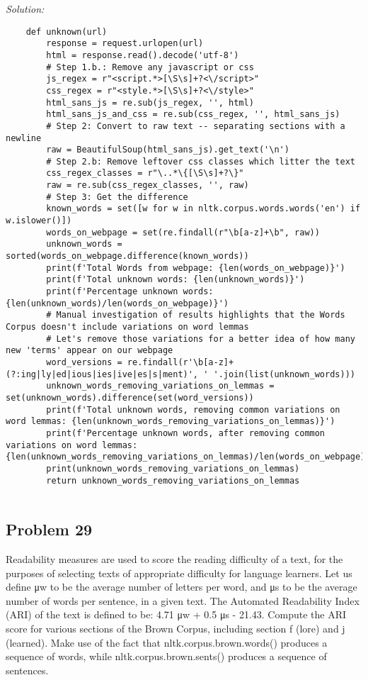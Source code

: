 \documentclass[11pt]{article}
\newenvironment{solution}{
	\vspace{10px}\noindent\emph{Solution:}
}{
	\vspace{10px}
}
\begin{document}
\begin{solution}
	\begin{lstlisting}
	def unknown(url)
		response = request.urlopen(url)
		html = response.read().decode('utf-8')
		# Step 1.b.: Remove any javascript or css
		js_regex = r"<script.*>[\S\s]+?<\/script>"
		css_regex = r"<style.*>[\S\s]+?<\/style>"
		html_sans_js = re.sub(js_regex, '', html)
		html_sans_js_and_css = re.sub(css_regex, '', html_sans_js)
		# Step 2: Convert to raw text -- separating sections with a newline
		raw = BeautifulSoup(html_sans_js).get_text('\n')
		# Step 2.b: Remove leftover css classes which litter the text
		css_regex_classes = r"\..*\{[\S\s]+?\}"
		raw = re.sub(css_regex_classes, '', raw)
		# Step 3: Get the difference  
		known_words = set([w for w in nltk.corpus.words.words('en') if w.islower()])
		words_on_webpage = set(re.findall(r"\b[a-z]+\b", raw))
		unknown_words = sorted(words_on_webpage.difference(known_words))
		print(f'Total Words from webpage: {len(words_on_webpage)}')
		print(f'Total unknown words: {len(unknown_words)}')
		print(f'Percentage unknown words: {len(unknown_words)/len(words_on_webpage)}')
		# Manual investigation of results highlights that the Words Corpus doesn't include variations on word lemmas 
		# Let's remove those variations for a better idea of how many new 'terms' appear on our webpage 
		word_versions = re.findall(r'\b[a-z]+(?:ing|ly|ed|ious|ies|ive|es|s|ment)', ' '.join(list(unknown_words)))
		unknown_words_removing_variations_on_lemmas = set(unknown_words).difference(set(word_versions))
		print(f'Total unknown words, removing common variations on word lemmas: {len(unknown_words_removing_variations_on_lemmas)}')
		print(f'Percentage unknown words, after removing common variations on word lemmas: {len(unknown_words_removing_variations_on_lemmas)/len(words_on_webpage)}')
		print(unknown_words_removing_variations_on_lemmas)
		return unknown_words_removing_variations_on_lemmas
		
	\end{lstlisting}
	
\end{solution} 


\newpage
\subsection*{Problem 29}

Readability measures are used to score the reading difficulty of a text, for the purposes of selecting texts of appropriate difficulty for language learners. Let us define μw to be the average number of letters per word, and μs to be the average number of words per sentence, in a given text. The Automated Readability Index (ARI) of the text is defined to be: 4.71 μw + 0.5 μs - 21.43. Compute the ARI score for various sections of the Brown Corpus, including section f (lore) and j (learned). Make use of the fact that nltk.corpus.brown.words() produces a sequence of words, while nltk.corpus.brown.sents() produces a sequence of sentences.
\end{document}
